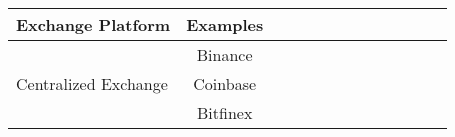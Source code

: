 



\begin{table*}[t]
\centering
\begin{tabular}{|l|c|p{0.4cm}|p{0.4cm}|p{0.4cm}|p{0.4cm}|p{0.4cm}|p{0.4cm}|p{0.4cm}|p{0.4cm}|p{0.4cm}|p{0.4cm}|p{0.4cm}|}

\multicolumn{1}{c}{\textbf{Exchange Platform}} & 
\multicolumn{1}{c}{\textbf{Examples}} & 

\headrow{Non-Custodial} &
\headrow{No Trusted Third Party} & 
\headrow{Fully Autonomous} & 
\headrow{Resilient to Front-running} &


\headrow{Resilient to Server Downtime} & 
\headrow{Resilient to Ethereum Network Congestion} & 
\headrow{High Trade Performance} &

\headrow{Certain Fulfillment} &
\headrow{Low Price Slippage} &
\headrow{No Impermanent Loss} &
\headrow{T+0 Settlement} \\

\hline

%
\multirow{3}{*}{Centralized Exchange}    		&Binance			&\multirow{3}{*}{\empt}		&\multirow{3}{*}{\empt}		&\multirow{3}{*}{\empt}		&\multirow{3}{*}{\empt}		&\multirow{3}{*}{\empt}		&\multirow{3}{*}{\full} 		&\multirow{3}{*}{\full}		&\multirow{3}{*}{\empt}		&\multirow{3}{*}{\full}		&\multirow{3}{*}{\full }		&\multirow{3}{*}{ \empt} 		\\ 
							         		&Coinbase			& 					&					&					&					&					&						&						&						&						& 						&						\\
										&Bitfinex     			& 					&					&					&					&					&						&						&						&						& 						&						\\ \hline	


\end{tabular}
\end{table*}
